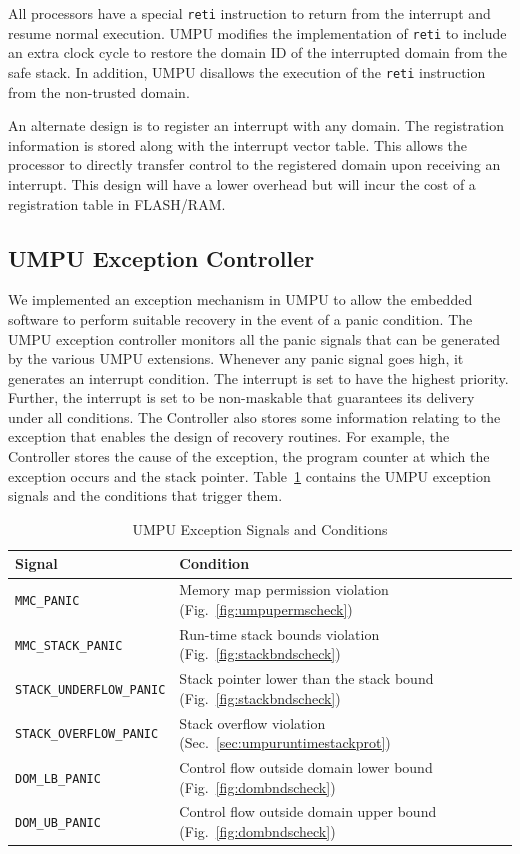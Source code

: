 All processors have a special \texttt{reti} instruction to return from
the interrupt and resume normal execution.
%
UMPU modifies the implementation of \texttt{reti} to include an extra
clock cycle to restore the domain ID of the interrupted domain from
the safe stack.
%
In addition, UMPU disallows the execution of the \texttt{reti} instruction from the non-trusted domain.

An alternate design is to register an interrupt with any
domain.
%
The registration information is stored along with the interrupt
vector table.
%
This allows the processor to directly transfer control to the registered domain
upon receiving an interrupt.
%
This design will have a lower overhead but will incur the cost of a
registration table in FLASH/RAM.
\subsection{UMPU Exception Controller}
%
We implemented an exception mechanism in UMPU to allow the
embedded software to perform suitable recovery in the event of a panic
condition.
%
The UMPU exception controller monitors all the panic signals that can
be generated by the various UMPU extensions.
%
Whenever any panic signal goes high, it generates an interrupt
condition.
%
The interrupt is set to have the highest priority.
%
Further, the interrupt is set to be non-maskable that guarantees its
delivery under all conditions.
%
The Controller also stores some information relating to the exception
that enables the design of recovery routines.
%
For example, the Controller stores the cause of the exception, the
program counter at which the exception occurs and the stack pointer.
%
Table~\ref{tab:umpuexceptions} contains the UMPU exception signals and
the conditions that trigger them.
%
\begin{table}[htdp]
\centering
\small{
\begin{tabular}{|l|l|}
	\hline
	Signal & Condition\\
	\hline
	\texttt{MMC\_PANIC} & Memory map permission violation
        (Fig.~\ref{fig:umpupermscheck})\\
	\texttt{MMC\_STACK\_PANIC} & Run-time stack bounds violation
        (Fig.~\ref{fig:stackbndscheck})\\
	\texttt{STACK\_UNDERFLOW\_PANIC} & Stack pointer lower than
        the stack bound (Fig.~\ref{fig:stackbndscheck}) \\
	\texttt{STACK\_OVERFLOW\_PANIC} & Stack overflow violation
        (Sec.~\ref{sec:umpuruntimestackprot})\\
        \texttt{DOM\_LB\_PANIC} & Control flow outside domain lower
        bound (Fig.~\ref{fig:dombndscheck})\\
        \texttt{DOM\_UB\_PANIC} & Control flow outside domain upper
        bound (Fig.~\ref{fig:dombndscheck})\\
	\hline
\end{tabular}}
\caption{UMPU Exception Signals and Conditions}
\label{tab:umpuexceptions}
\end{table}

